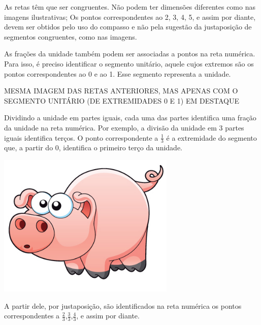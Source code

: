 \documentclass[a4,12pt]{book}
\begin{document}
As retas têm que ser congruentes. Não podem ter dimensões diferentes como nas imagens ilustrativas; \mbox{} \newline
Os pontos correspondentes ao  2, 3, 4, 5, e assim por diante, devem ser obtidos pelo uso do compasso e não pela sugestão da justaposição de segmentos congruentes, como nas imagens.



\mbox{} \newline
As frações da unidade também podem ser associadas a pontos na reta numérica. Para isso, é preciso identificar o segmento unitário, aquele cujos extremos são os pontos correspondentes ao 0 e ao 1. Esse segmento representa a unidade.

\begin{imagem*}[breakable]{}{}   MESMA IMAGEM DAS RETAS ANTERIORES, MAS APENAS COM O SEGMENTO UNITÁRIO (DE EXTREMIDADES 0 E 1) EM DESTAQUE  \end{imagem*}

Dividindo a unidade em partes iguais,  cada uma das partes identifica uma fração da unidade na reta numérica.
Por exemplo, a divisão da unidade em 3 partes iguais identifica terços. O ponto correspondente a $\frac{1}{3}$  é a extremidade do segmento que, a partir do 0, identifica o primeiro terço da unidade.

\begin{imagem*}[breakable]{}{}       \includegraphics[width=240pt, keepaspectratio]{pig}   \end{imagem*}

A partir dele, por justaposição, são identificados na reta numérica os pontos correspondentes a $\frac{2}{3}$,$\frac{3}{3}$,$\frac{4}{3}$, e assim por diante.
\end{document}
